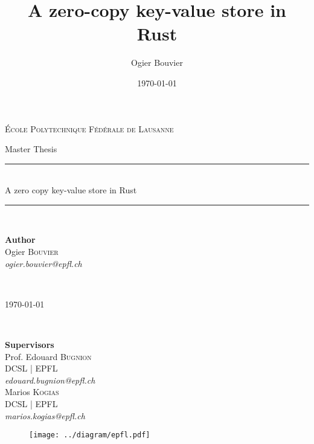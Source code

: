 \documentclass[11pt]{book}
\author{Ogier Bouvier}
\date{\today}
\title{A zero-copy key-value store in Rust}
\begin{document}
\begin{titlepage}
	\newcommand{\HRule}{\rule{\linewidth}{0.5mm}} %
	\center

\LARGE \textsc{École Polytechnique Fédérale de Lausanne}
\vspace{1cm}

\LARGE Master Thesis
\vspace{2cm}

	{
		\HRule \\[0.5cm]
		\Huge A zero copy key-value store in Rust}
	\HRule \\[1cm]

	\vspace{2cm}
	\begin{minipage}[t]{0.4\textwidth}
		\begin{flushleft} \large
			\textbf{Author} \\
			Ogier \textsc{Bouvier}\\
			\textit{ogier.bouvier@epfl.ch}
		\end{flushleft}
	\end{minipage}
	~
	\begin{minipage}[t]{0.4\textwidth}
		\begin{flushright} \large
				{\large \today}
		\end{flushright}
	\end{minipage}\\[1cm]

	\begin{minipage}[t]{0.4\textwidth}
		\begin{flushleft} \large
		\textbf{Supervisors} \\
			Prof. Edouard \textsc{Bugnion}\\
			DCSL | EPFL \\
			\textit{edouard.bugnion@epfl.ch} \\
			Marios \textsc{Kogias}\\
			DCSL | EPFL \\
			\textit{marios.kogias@epfl.ch}
			\end{flushleft}
	\end{minipage}

	\begin{figure}[h]
		\begin{minipage}[t]{\textwidth}
				\texttt{[image: ../diagram/epfl.pdf]}
		\end{minipage}
		\hfill
	\end{figure}


\end{titlepage}
\end{document}
